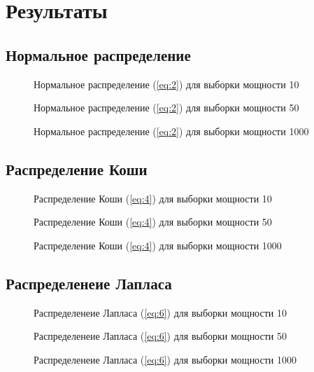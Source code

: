 \documentclass{article}
\begin{document}
\section{Результаты}

\subsection{Нормальное распределение}
\begin{figure}[h]
\caption{Нормальное распределение (\ref{eq:2}) для выборки мощности 10}
\end{figure}
\begin{figure}[h]
\caption{Нормальное распределение (\ref{eq:2}) для выборки мощности 50}
\end{figure}
\begin{figure}[h]
\caption{Нормальное распределение (\ref{eq:2}) для выборки мощности 1000}
\end{figure}

\newpage
\subsection{Распределение Коши}
\begin{figure}[h]
\caption{Распределение Коши (\ref{eq:4}) для выборки мощности 10}
\end{figure}
\begin{figure}[h]
\caption{Распределение Коши (\ref{eq:4}) для выборки мощности 50}
\end{figure}
\begin{figure}[h]
\caption{Распределение Коши (\ref{eq:4}) для выборки мощности 1000}
\end{figure}

\newpage
\subsection{Распределенеие Лапласа}
\begin{figure}[h]
\caption{Распределенеие Лапласа (\ref{eq:6}) для выборки мощности 10}
\end{figure}
\begin{figure}[h]
\caption{Распределенеие Лапласа (\ref{eq:6}) для выборки мощности 50}
\end{figure}
\begin{figure}[h]
\caption{Распределенеие Лапласа (\ref{eq:6}) для выборки мощности 1000}
\end{figure}
\end{document}

